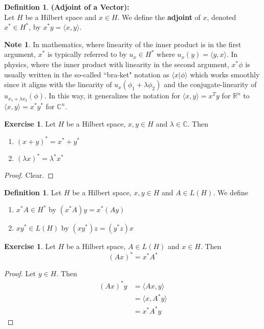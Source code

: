 \documentclass[12pt]{amsart}
\theoremstyle{definition}
\newtheorem{defn}[definition]{Definition}
\newtheorem{note}[definition]{Note}
\newtheorem{ex}[definition]{Exercise}
\newcommand{\lam}{\lambda}
\newcommand{\C}{\mathbb{C}}
\newcommand{\R}{\mathbb{R}}
\renewcommand{\r}{\rangle}
\renewcommand{\l}{\langle}
\newcommand{\lex}[1]{\label{ex:#1}}
\newcommand{\ld}[1]{\label{defn:#1}}
\begin{document}
\begin{defn} \ld{}\textbf{(Adjoint of a Vector):} \\
	Let $H$ be a Hilbert space and $x \in H$. We define the \textbf{adjoint} of $x$, denoted $x^* \in H^*$, by $x^* y = \l x, y \r$. 
\end{defn}

\begin{note}
	In mathematics, where linearity of the inner product is in the first argument, $x^{*}$ is typically referred to by $u_{x} \in H^{*} $ where $u_{x}(y) = \l y, x\r$. In physics, where the inner product with linearity in the second argument, $x^{*} \phi$ is usually written in the so-called ``bra-ket" notation as $\l x | \phi \r$ which works smoothly since it aligns with the linearity of $u_{x}(\phi_1 + \lam \phi_2)$ and the conjugate-linearity of $u_{x_1 + \lam x_2}(\phi)$. In this way, it generalizes the notation for $\l x, y\r = x^T y$ for $\R^n$ to $\l x, y\r = x^*y^*$ for $\C^n$. 
\end{note}

\begin{ex} \lex{}
	Let $H$ be a Hilbert space, $x, y \in H$ and $\lam \in \C$. Then 
	\begin{enumerate}
		\item $(x + y)^* =  x^* + y^*$
		\item $(\lam x)^* = \lam^* x^*$
	\end{enumerate}
\end{ex}

\begin{proof}
	Clear.
\end{proof}

\begin{defn} \ld{}
	Let $H$ be a Hilbert space, $x, y \in H$ and $A \in L(H)$. We define 
	\begin{enumerate}
		\item $x^* A \in H^*$ by $(x^*A) y = x^*(A y)$
		\item $x y^* \in L(H)$ by $(x y^*) z = (y^*z) x$
	\end{enumerate}
\end{defn}

\begin{ex} \lex{}
	Let $H$ be a Hilbert space, $A \in L(H)$ and $x \in H$. Then $$(A x)^*= x^*A^*$$
\end{ex}

\begin{proof}
	Let $y \in H$. Then 
	\begin{align*}
		(Ax)^*	y 
		&= \l Ax, y \r \\
		&= \l x, A^* y \r \\
		&= x^*A^* y
	\end{align*}
\end{proof}
\end{document}
